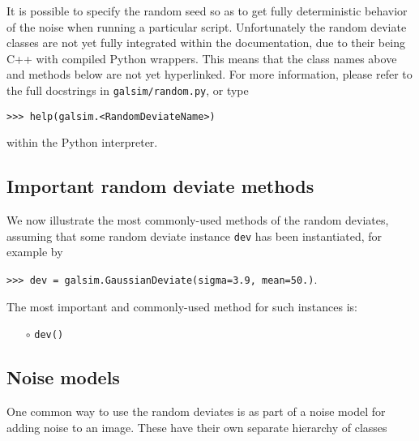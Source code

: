 \documentclass[preprint,11pt]{../../devel/modules/aastex}
\begin{document}
It is possible to specify the random seed so as to get fully
deterministic behavior of the noise when running a particular script.
Unfortunately the random deviate classes are not yet fully integrated
within the documentation, due to their being C++ with compiled Python
wrappers.  This means that the class names above and methods below are
not yet hyperlinked.  For more information, please refer to the full docstrings in
\texttt{galsim/random.py},
or type

{\tt >>> help(galsim.<RandomDeviateName>)}

within the Python interpreter.

\subsection{Important random deviate methods}\label{sect:randommethods}
We now illustrate the most commonly-used methods of the random
deviates, assuming that some random deviate instance \texttt{dev} has
been instantiated, for example by

{\tt >>> dev = galsim.GaussianDeviate(sigma=3.9, mean=50.)}.

The most important and commonly-used method for such
instances is:
\begin{itemize}

\item[$\circ$] \texttt{dev()} 

\end{itemize}

\subsection{Noise models}\label{sect:noisemodels}

One common way to use the random deviates is as part of a noise model for adding
noise to an image.  These have their own separate hierarchy of classes
\end{document}
